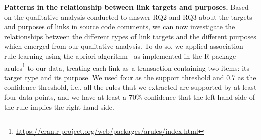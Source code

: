 \documentclass[smallextended]{svjour3}       %
\begin{document}
\textbf{Patterns in the relationship between link targets and purposes.} Based on the qualitative analysis conducted to answer RQ2 and RQ3 about
the targets and purposes of links in source code comments,
we can now investigate the relationships between the
different types of link targets and the different purposes which emerged from our qualitative analysis. To do so, we applied
association rule learning using the apriori algorithm~\citep{agrawal1994fast} as implemented in the R package arules\footnote{\url{https://cran.r-project.org/web/packages/arules/index.html}} to our data, treating
each link as a transaction containing two items: its target type
and its purpose. We used four as the support threshold and 0.7
as the confidence threshold, i.e., all the rules that we extracted are
supported by at least four data points, and we have at least a
70\% confidence that the left-hand side of the rule implies the
right-hand side.
\end{document}
